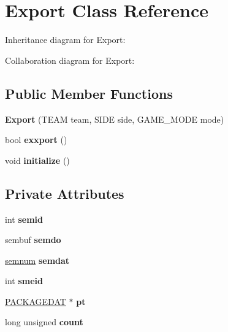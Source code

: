 \hypertarget{classExport}{}\section{Export Class Reference}
\label{classExport}


Inheritance diagram for Export\+:


Collaboration diagram for Export\+:
\subsection*{Public Member Functions}
\begin{DoxyCompactItemize}
\item 
{\bfseries Export} (T\+E\+AM team, S\+I\+DE side, G\+A\+M\+E\+\_\+\+M\+O\+DE mode)\hypertarget{classExport_abd332de26220c1eabf46bf04b296d4d6}{}\label{classExport_abd332de26220c1eabf46bf04b296d4d6}

\item 
bool {\bfseries exxport} ()\hypertarget{classExport_a2f5c199d2119b236bb99394bdcb8aae0}{}\label{classExport_a2f5c199d2119b236bb99394bdcb8aae0}

\item 
void {\bfseries initialize} ()\hypertarget{classExport_aeae039a5f435d82eb0c5bb1524dc1f4f}{}\label{classExport_aeae039a5f435d82eb0c5bb1524dc1f4f}

\end{DoxyCompactItemize}
\subsection*{Private Attributes}
\begin{DoxyCompactItemize}
\item 
int {\bfseries semid}\hypertarget{classExport_ac1c1a3d656c980120a887bf2a4afb9e3}{}\label{classExport_ac1c1a3d656c980120a887bf2a4afb9e3}

\item 
sembuf {\bfseries semdo}\hypertarget{classExport_a9d538abb207fff0b8a6185fe7819af46}{}\label{classExport_a9d538abb207fff0b8a6185fe7819af46}

\item 
\hyperlink{unionsemnum}{semnum} {\bfseries semdat}\hypertarget{classExport_a79bfe2d4889a42d7c751e60fa1de53f1}{}\label{classExport_a79bfe2d4889a42d7c751e60fa1de53f1}

\item 
int {\bfseries smeid}\hypertarget{classExport_ad0db0335447abe6aeed98b66581b1d6a}{}\label{classExport_ad0db0335447abe6aeed98b66581b1d6a}

\item 
\hyperlink{structPACKAGEDAT}{P\+A\+C\+K\+A\+G\+E\+D\+AT} $\ast$ {\bfseries pt}\hypertarget{classExport_a20a8b57834268b6b8703269822fe105b}{}\label{classExport_a20a8b57834268b6b8703269822fe105b}

\item 
long unsigned {\bfseries count}\hypertarget{classExport_a516498013ca473db2d0c6efdc085e566}{}\label{classExport_a516498013ca473db2d0c6efdc085e566}

\end{DoxyCompactItemize}
